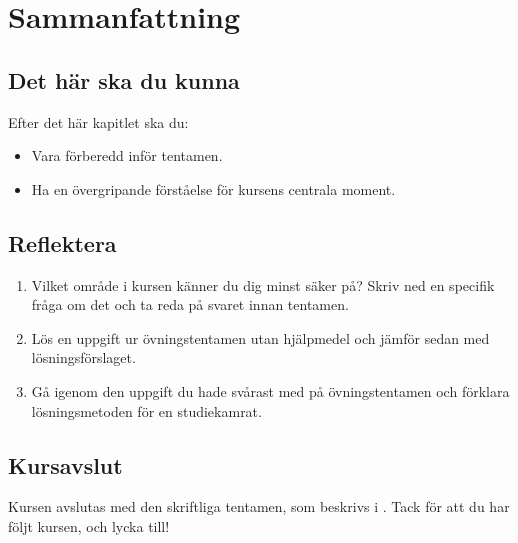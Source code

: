 
\section{Sammanfattning}
\label{c19:sec:sammanfattning}

\subsection*{Det här ska du kunna}
Efter det här kapitlet ska du:
\begin{itemize}
  \item Vara förberedd inför tentamen.
  \item Ha en övergripande förståelse för kursens centrala moment.
\end{itemize}

\subsection*{Reflektera}
\begin{enumerate}
  \item Vilket område i kursen känner du dig minst säker på? Skriv ned en specifik fråga om det
    och ta reda på svaret innan tentamen.
  \item Lös en uppgift ur övningstentamen utan hjälpmedel och jämför sedan med
    lösningsförslaget.
  \item Gå igenom den uppgift du hade svårast med på övningstentamen och förklara lösningsmetoden
    för en studiekamrat.
\end{enumerate}

\subsection*{Kursavslut}
Kursen avslutas med den skriftliga tentamen, som beskrivs i .
Tack för att du har följt kursen, och lycka till!
